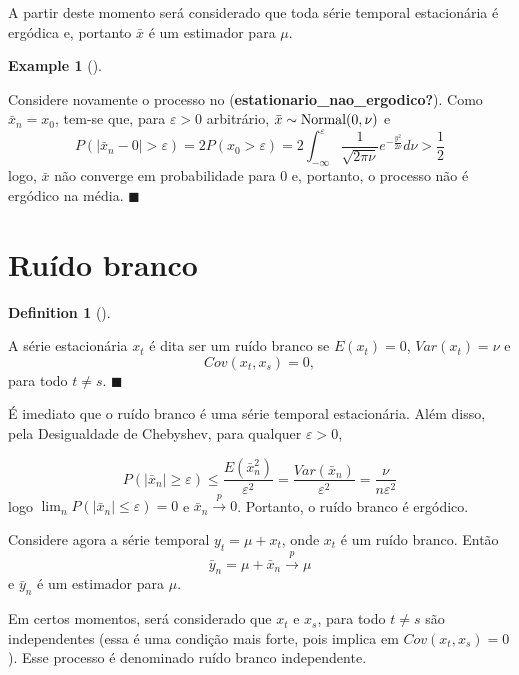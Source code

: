 \documentclass[
  letterpaper,
  DIV=11,
  numbers=noendperiod]{scrreprt}
\theoremstyle{plain}
\theoremstyle{definition}
\newtheorem{example}{Example}[chapter]
\theoremstyle{definition}
\newtheorem{definition}{Definition}[chapter]
\theoremstyle{remark}
\begin{document}
A partir deste momento será considerado que toda série temporal
estacionária é ergódica e, portanto \(\bar{x}\) é um estimador para
\(\mu\).

\begin{example}[]\protect\hypertarget{exm-estationario_nao_ergodico_conclusao}{}\label{exm-estationario_nao_ergodico_conclusao}

Considere novamente o processo no
(\textbf{estationario\_nao\_ergodico?}). Como \(\bar{x}_n=x_0\), tem-se
que, para \(\varepsilon>0\) arbitrário,
\(\bar{x}\sim\hbox{Normal}(0,\nu)\) e
\[P(|\bar{x}_n-0|>\varepsilon)=2P(x_0>\varepsilon)=2\int_{-\infty}^\varepsilon \frac{1}{\sqrt{2\pi\nu}}e^{-\frac{y^2}{2\nu}}d\nu>\frac{1}{2}\]
logo, \(\bar{x}\) não converge em probabilidade para \(0\) e, portanto,
o processo não é ergódico na média. \(\blacksquare\)

\end{example}

\hypertarget{ruuxeddo-branco}{%
\section{Ruído branco}\label{ruuxeddo-branco}}

\begin{definition}[]\protect\hypertarget{def-ruido_branco}{}\label{def-ruido_branco}

A série estacionária \(x_t\) é dita ser um ruído branco se \(E(x_t)=0\),
\(Var(x_t)=\nu\) e \[\begin{equation}
        Cov(x_t,x_s)=0,
        \end{equation}\] para todo \(t\neq s\). \(\blacksquare\)

\end{definition}

É imediato que o ruído branco é uma série temporal estacionária. Além
disso, pela Desigualdade de Chebyshev, para qualquer \(\varepsilon>0\),

\[P\left(|\bar{x}_n|\geq\varepsilon\right)\leq \frac{E(\bar{x}_n^2)}{\varepsilon^2}=\frac{Var(\bar{x}_n)}{\varepsilon^2}=\frac{\nu}{n\varepsilon^2}\]
logo \(\lim_{n}P(|\bar{x}_n|\leq \varepsilon)=0\) e
\(\bar{x}_n\stackrel{p}{\rightarrow}0\). Portanto, o ruído branco é
ergódico.

Considere agora a série temporal \(y_t=\mu+x_t\), onde \(x_t\) é um
ruído branco. Então
\[\bar{y}_n=\mu+\bar{x}_n\stackrel{p}{\rightarrow}\mu\] e \(\bar{y}_n\)
é um estimador para \(\mu\).

Em certos momentos, será considerado que \(x_t\) e \(x_s\), para todo
\(t\neq s\) são independentes (essa é uma condição mais forte, pois
implica em \(Cov(x_t,x_s)=0\)). Esse processo é denominado ruído branco
independente.
\end{document}
